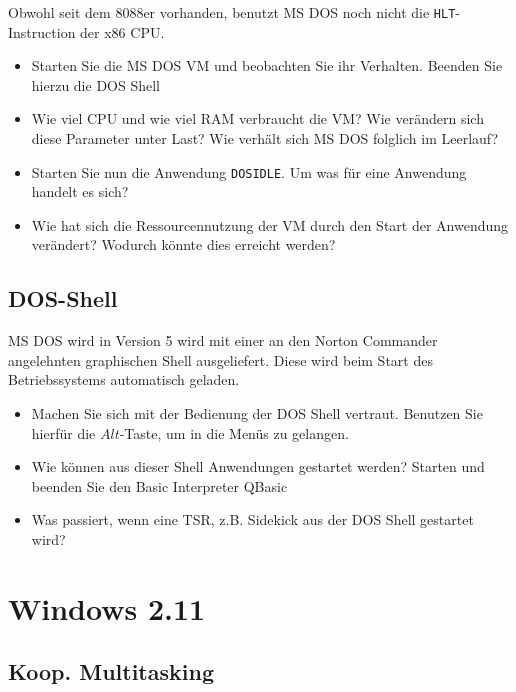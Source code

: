 	Obwohl seit dem 8088er vorhanden, benutzt MS DOS noch nicht die \texttt{HLT}-Instruction der x86 CPU.
	
	\begin{itemize}
		\item Starten Sie die MS DOS VM und beobachten Sie ihr Verhalten. Beenden Sie hierzu die DOS Shell
		\item Wie viel CPU und wie viel RAM verbraucht die VM? Wie verändern sich diese Parameter unter Last? Wie verhält sich MS DOS folglich im Leerlauf?
		\item Starten Sie nun die Anwendung \texttt{DOSIDLE}. Um was für eine Anwendung handelt es sich?
		\item Wie hat sich die Ressourcennutzung der VM durch den Start der Anwendung verändert? Wodurch könnte dies erreicht werden?
	\end{itemize}


	\subsection{DOS-Shell}

	MS DOS wird in Version 5 wird mit einer an den Norton Commander angelehnten graphischen Shell ausgeliefert. Diese wird beim Start des Betriebssystems automatisch geladen.

	\begin{itemize}
		\item Machen Sie sich mit der Bedienung der DOS Shell vertraut. Benutzen Sie hierfür die $Alt$-Taste, um in die Menüs zu gelangen.
		\item Wie können aus dieser Shell Anwendungen gestartet werden? Starten und beenden Sie den Basic Interpreter QBasic
		\item Was passiert, wenn eine TSR, z.B. Sidekick aus der DOS Shell gestartet wird? 
	\end{itemize}

\section{Windows 2.11}

	\subsection{Koop. Multitasking}

